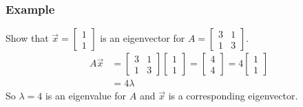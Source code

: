 \documentclass[letterpaper, 12pt]{math}
\begin{document}
\subsubsection*{Example}
Show that \( \vec{x} = \begin{bmatrix}1 \\ 1\end{bmatrix} \) is an
eigenvector for \( A = \begin{bmatrix}3 & 1 \\ 1 & 3\end{bmatrix} \).
\begin{align*}
  A\vec{x} &= \begin{bmatrix}
    3 & 1 \\
    1 & 3
  \end{bmatrix}\begin{bmatrix}1 \\ 1\end{bmatrix}
    = \begin{bmatrix}4 \\ 4\end{bmatrix}
    = 4\begin{bmatrix}1 \\ 1\end{bmatrix} \\
  &= 4\lambda
\end{align*}
So \( \lambda = 4 \) is an eigenvalue for \( A \) and \( \vec{x} \) is a
corresponding eigenvector.
\end{document}
